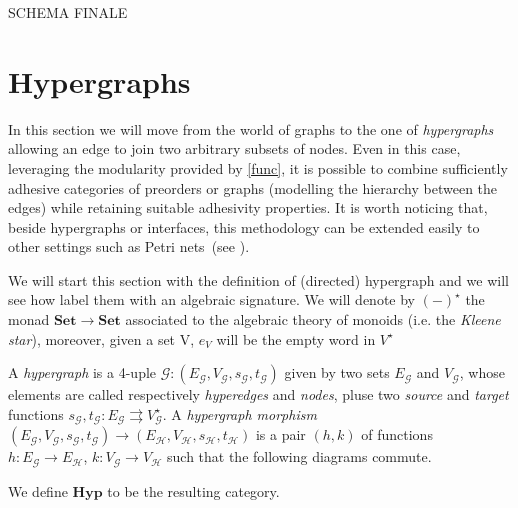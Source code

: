 \documentclass[a4paper,UKenglish,cleveref,pdftex,thm-restate,numberwithinsect]{lipics-v2021}
\newcommand{\cat}[1]{\ensuremath{\mathbf{#1}}}
\newcommand{\hyp}{\cat{Hyp}}
\begin{document}
SCHEMA FINALE


\section{Hypergraphs}

In this section we will move from the world of graphs to the one of \emph{hypergraphs} allowing an edge to join two arbitrary subsets of nodes. Even in this case,  leveraging the modularity provided by \cref{func}, it is possible to combine sufficiently adhesive categories of preorders or graphs (modelling the hierarchy between the edges) while retaining suitable adhesivity properties.  It is worth noticing that, beside hypergraphs or interfaces, this methodology can be extended easily to other settings such as Petri nets~(see \cite{ehrig1991parallelism}).


We will start this section with the definition of (directed) hypergraph and we will see how label them with an algebraic signature. We will denote by $(-)^\star$ the monad $\cat{Set}\to \cat{Set}$ associated to the algebraic theory of monoids (i.e. the \emph{Kleene star}), moreover, given a set V, $e_V$ will be the empty word in $V^{\star}$ 


\begin{definition}A \emph{hypergraph} is a 4-uple $\mathcal{G}:(E_\mathcal{G}, V_\mathcal{G}, s_\mathcal{G}, t_\mathcal{G})$ given by two sets $E_\mathcal{G}$ and $V_\mathcal{G}$, whose elements are called respectively \emph{hyperedges} and \emph{nodes}, pluse two \emph{source} and \emph{target}  functions $s_\mathcal{G}, t_\mathcal{G}:E_\mathcal{G}\rightrightarrows V_\mathcal{G}^\star$. A \emph{hypergraph morphism} $(E_\mathcal{G}, V_\mathcal{G}, s_\mathcal{G}, t_\mathcal{G})\to (E_\mathcal{H}, V_\mathcal{H}, s_\mathcal{H}, t_\mathcal{H})$ is a pair $(h,k)$ of functions $h:E_\mathcal{G}\to E_\mathcal{H}$, $k:V_\mathcal{G}\to V_\mathcal{H}$ such that the following diagrams commute.
	\begin{center}
	\end{center}	 
	We define $\hyp$ to be the resulting category.
\end{definition}
\end{document}
